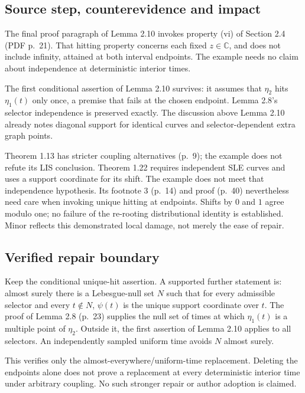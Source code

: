 \documentclass[10pt]{article}
\begin{document}
\subsection*{Source step, counterevidence and impact}
The final proof paragraph of Lemma 2.10 invokes property (vi) of Section 2.4 (PDF p. 21). That hitting property concerns each fixed \(z\in\mathbb C\), and does not include infinity, attained at both interval endpoints. The example needs no claim about independence at deterministic interior times.\par
The first conditional assertion of Lemma 2.10 survives: it assumes that \(\eta_2\) hits \(\eta_1(t)\) only once, a premise that fails at the chosen endpoint. Lemma 2.8’s selector independence is preserved exactly. The discussion above Lemma 2.10 already notes diagonal support for identical curves and selector-dependent extra graph points.\par
Theorem 1.13 has stricter coupling alternatives (p. 9); the example does not refute its LIS conclusion. Theorem 1.22 requires independent SLE curves and uses a support coordinate for its shift. The example does not meet that independence hypothesis. Its footnote 3 (p. 14) and proof (p. 40) nevertheless need care when invoking unique hitting at endpoints. Shifts by \(0\) and \(1\) agree modulo one; no failure of the re-rooting distributional identity is established. Minor reflects this demonstrated local damage, not merely the ease of repair.\par
\subsection*{Verified repair boundary}
Keep the conditional unique-hit assertion. A supported further statement is: almost surely there is a Lebesgue-null set \(N\) such that for every admissible selector and every \(t\notin N\), \(\psi(t)\) is the unique support coordinate over \(t\). The proof of Lemma 2.8 (p. 23) supplies the null set of times at which \(\eta_1(t)\) is a multiple point of \(\eta_2\). Outside it, the first assertion of Lemma 2.10 applies to all selectors. An independently sampled uniform time avoids \(N\) almost surely.\par
This verifies only the almost-everywhere/uniform-time replacement. Deleting the endpoints alone does not prove a replacement at every deterministic interior time under arbitrary coupling. No such stronger repair or author adoption is claimed.\par
\end{document}
